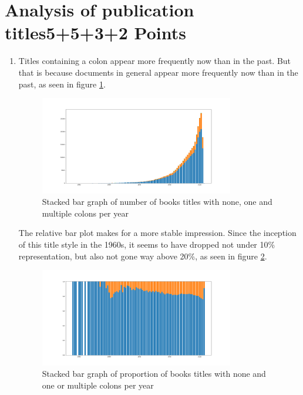 \documentclass[10pt,a4paper]{article}
\begin{document}
\section{\hfill Analysis of publication titles\hfill 5+5+3+2 Points}
\begin{enumerate}
    \item Titles containing a colon appear more frequently now than in the past. But that is because documents in general appear more frequently now than in the past, as seen in figure \ref{fig:1}.
    \begin{figure}[h!!]
        \centering
        \includegraphics[width=0.8\textwidth]{Figure_1.png}
        \caption{Stacked bar graph of number of books titles with none, one and multiple colons per year}
        \label{fig:1}
    \end{figure}
    
    The relative bar plot makes for a more stable impression. Since the inception of this title style in the 1960s, it seems to have dropped not under 10\% representation, but also not gone way above 20\%, as seen in figure \ref{fig:2}.
    \begin{figure}[h]
        \centering
        \includegraphics[width=0.8\textwidth]{Figure_2.png}
        \caption{Stacked bar graph of proportion of books titles with none and one or multiple colons per year}
        \label{fig:2}
    \end{figure}
    

\end{enumerate}
\end{document}
